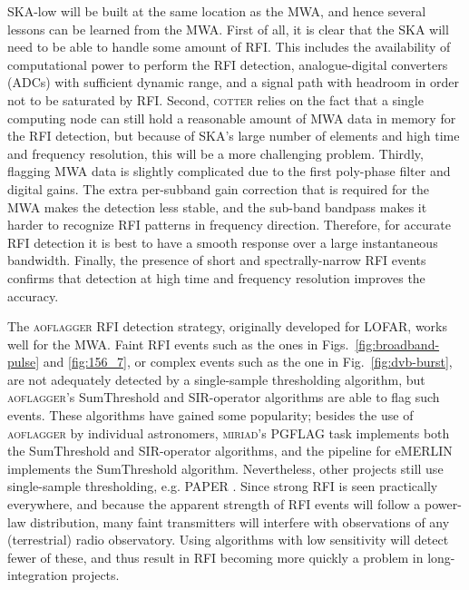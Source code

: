 \documentclass{pasa}
\begin{document}
SKA-low will be built at the same location as the MWA, and hence several lessons can be learned from the MWA. First of all, it is clear that the SKA will need to be able to handle some amount of RFI. This includes the availability of computational power to perform the RFI detection, analogue-digital converters (ADCs) with sufficient dynamic range, and a signal path with headroom in order not to be saturated by RFI. Second, \textsc{cotter} relies on the fact that a single computing node can still hold a reasonable amount of MWA data in memory for the RFI detection, but because of SKA's large number of elements and high time and frequency resolution, this will be a more challenging problem. Thirdly, flagging MWA data is slightly complicated due to the first poly-phase filter and digital gains. The extra per-subband gain correction that is required for the MWA makes the detection less stable, and the sub-band bandpass makes it harder to recognize RFI patterns in frequency direction. Therefore, for accurate RFI detection it is best to have a smooth response over a large instantaneous bandwidth. Finally, the presence of short and spectrally-narrow RFI events confirms that detection at high time and frequency resolution improves the accuracy.

The \textsc{aoflagger} RFI detection strategy, originally developed for LOFAR, works well for the MWA. Faint RFI events such as the ones in Figs.~\ref{fig:broadband-pulse} and \ref{fig:156_7}, or complex events such as the one in Fig.~\ref{fig:dvb-burst}, are not adequately detected by a single-sample thresholding algorithm, but \textsc{aoflagger}'s SumThreshold and SIR-operator algorithms are able to flag such events. These algorithms have gained some popularity; besides the use of \textsc{aoflagger} by individual astronomers, \textsc{miriad}'s PGFLAG task implements both the SumThreshold and SIR-operator algorithms, and the pipeline for eMERLIN \citep{serpent-peck-2013} implements the SumThreshold algorithm. Nevertheless, other projects still use single-sample thresholding, e.g. PAPER \citep{parsons-paper-eorlimit-2014}. Since strong RFI is seen practically everywhere, and because the apparent strength of RFI events will follow a power-law distribution, many faint transmitters will interfere with observations of any (terrestrial) radio observatory. Using algorithms with low sensitivity will detect fewer of these, and thus result in RFI becoming more quickly a problem in long-integration projects.
\end{document}
